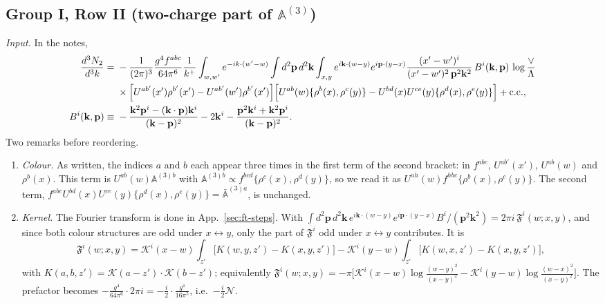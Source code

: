 \documentclass[10pt]{article}
\numberwithin{equation}{section}
\newcommand{\KK}{\mathcal K}
\newcommand{\NN}{\mathcal N}
\begin{document}
\subsection{Group I, Row II (two-charge part of $\mathbb A^{(3)}$)}\label{R:sec:GI.II}
\emph{Input.} In the notes,
\begin{align*}
\frac{d^3N_2}{d^3k}={}&-\frac{1}{(2\pi)^3}\frac{g^4f^{abc}}{64\pi^6}\frac1{k^+}\int_{w,w'}e^{-ik\cdot(w'-w)}\int d^2\mathbf p\,d^2\mathbf k\int_{x,y}e^{i\mathbf k\cdot(w-y)}e^{i\mathbf p\cdot(y-x)}\frac{(x'-w')^i}{(x'-w')^2\,\mathbf p^2\mathbf k^2}\,B^i(\mathbf k,\mathbf p)\,\log\frac{\vee}{\Lambda}\\
&\times\Big[U^{ab'}(x')\rho^{b'}(x')-U^{ab'}(w')\rho^{b'}(x')\Big]\Big[U^{ab}(w)\{\rho^b(x),\rho^c(y)\}-U^{bd}(x)U^{ce}(y)\{\rho^d(x),\rho^e(y)\}\Big]+{\rm c.c.},\\
B^i(\mathbf k,\mathbf p)\equiv{}&-\frac{\mathbf k^2\mathbf p^i-(\mathbf k\cdot\mathbf p)\mathbf k^i}{(\mathbf k-\mathbf p)^2}-2\mathbf k^i-\frac{\mathbf p^2\mathbf k^i+\mathbf k^2\mathbf p^i}{(\mathbf k-\mathbf p)^2}.
\end{align*}
Two remarks before reordering.
\begin{enumerate}
\item \emph{Colour.} As written, the indices $a$ and $b$ each appear three times in the first term of the second bracket: in $f^{abc}$, $U^{ab'}(x')$, $U^{ab}(w)$ and $\rho^b(x)$. This term is $U^{ab}(w)\mathbb A^{(3)b}$ with $\mathbb A^{(3)b}\propto f^{bcd}\{\rho^c(x),\rho^d(y)\}$, so we read it as $U^{ah}(w)f^{hbc}\{\rho^b(x),\rho^c(y)\}$. The second term, $f^{abc}U^{bd}(x)U^{ce}(y)\{\rho^d(x),\rho^e(y)\}=\bar{\mathbb A}^{(3)a}$, is unchanged.
\item \emph{Kernel.} The Fourier transform is done in App.~\ref{sec:ft-steps}. With $\int d^2\mathbf p\,d^2\mathbf k\,e^{i\mathbf k\cdot(w-y)}e^{i\mathbf p\cdot(y-x)}B^i/(\mathbf p^2\mathbf k^2)=2\pi i\,\mathfrak F^i(w;x,y)$, and since both colour structures are odd under $x\leftrightarrow y$, only the part of $\mathfrak F^i$ odd under $x\leftrightarrow y$ contributes. It is
\begin{equation*}
\mathfrak F^i(w;x,y)=\KK^i(x-w)\int_{z'}\big[K(w,y,z')-K(x,y,z')\big]-\KK^i(y-w)\int_{z'}\big[K(w,x,z')-K(x,y,z')\big],
\end{equation*}
with $K(a,b,z')=\KK(a-z')\cdot\KK(b-z')$; equivalently $\mathfrak F^i(w;x,y)=-\pi\big[\KK^i(x-w)\log\frac{(w-y)^2}{(x-y)^2}-\KK^i(y-w)\log\frac{(w-x)^2}{(x-y)^2}\big]$. The prefactor becomes $-\frac{g^4}{64\pi^6}\cdot2\pi i=-\frac{i}{2}\cdot\frac{g^4}{16\pi^5}$, i.e.\ $-\frac i2\NN$.
\end{enumerate}
\end{document}
